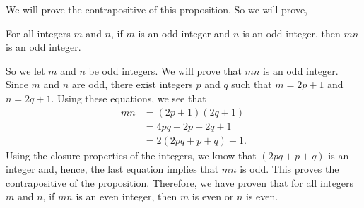 \begin{enumerate}
\begin{enumerate}
\begin{myproof}
We will prove the contrapositive of this proposition.  So we will prove,

\begin{list}{}
\item For all integers $m$ and $n$, if $m$ is an odd integer and $n$ is an odd integer, then $mn$ is an odd integer.
\end{list}
\vskip6pt
\noindent
So we let $m$ and $n$ be odd integers.  We will prove that $mn$ is an odd integer.  Since $m$ and $n$ are odd, there exist integers $p$ and $q$ such that $m = 2p + 1$ and $n = 2q + 1$.  Using these equations, we see that
\begin{align*}
mn &= (2p + 1)(2q + 1) \\
   &= 4pq + 2p + 2q + 1 \\
   &= 2(2pq + p + q) + 1.
\end{align*}
Using the closure properties of the integers, we know that $(2pq + p + q)$ is an integer and, hence, the last equation implies that $mn$ is odd.  This proves the contrapositive of the proposition.  Therefore, we have proven that for all integers $m$ and $n$, if $mn$ is an even integer, then $m$ is even or $n$ is even.
\end{myproof}
\end{enumerate}
\end{enumerate}



